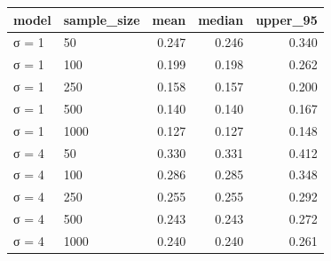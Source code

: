 
\begin{tabular}{llrrr}
\toprule
model & sample\_size & mean & median & upper\_95\\
\midrule
σ = 1 & 50 & 0.247 & 0.246 & 0.340\\
σ = 1 & 100 & 0.199 & 0.198 & 0.262\\
σ = 1 & 250 & 0.158 & 0.157 & 0.200\\
σ = 1 & 500 & 0.140 & 0.140 & 0.167\\
σ = 1 & 1000 & 0.127 & 0.127 & 0.148\\
\addlinespace
σ = 4 & 50 & 0.330 & 0.331 & 0.412\\
σ = 4 & 100 & 0.286 & 0.285 & 0.348\\
σ = 4 & 250 & 0.255 & 0.255 & 0.292\\
σ = 4 & 500 & 0.243 & 0.243 & 0.272\\
σ = 4 & 1000 & 0.240 & 0.240 & 0.261\\
\bottomrule
\end{tabular}
